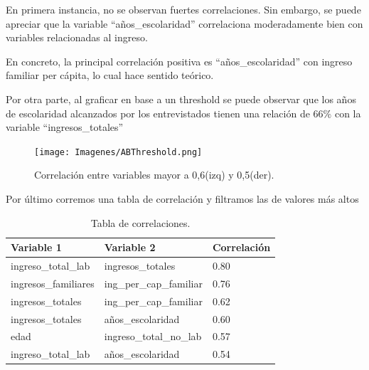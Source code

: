 \documentclass[a4paper]{article}
\begin{document}
        En primera instancia, no se observan fuertes correlaciones. Sin embargo, se puede apreciar que la variable ``años\_escolaridad'' correlaciona moderadamente bien con variables relacionadas al ingreso.
 
        En concreto, la principal correlación positiva es ``años\_escolaridad'' con ingreso familiar per cápita, lo cual hace sentido teórico.
        
        Por otra parte, al graficar en base a un threshold se puede observar que los años de escolaridad alcanzados por los entrevistados tienen una relación de $66\%$ con la variable ``ingresos\_totales''

        \begin{figure}[H]
            \centering
            \texttt{[image: Imagenes/ABThreshold.png]}
            \caption{Correlación entre variables mayor a 0,6(izq) y 0,5(der).}
            \label{AB Treshold Correlation}
        \end{figure}
 
        Por último corremos una tabla de correlación y filtramos las de valores más altos
 
        \begin{table}[H]
            \centering
            \begin{tabular}{|l|l|l|}
            \hline
                Variable 1 & Variable 2 & Correlación \\ \hline
                ingreso\_total\_lab & ingresos\_totales & 0.80 \\ \hline
                ingresos\_familiares & ing\_per\_cap\_familiar & 0.76 \\ \hline
                ingresos\_totales & ing\_per\_cap\_familiar & 0.62 \\ \hline
                ingresos\_totales & años\_escolaridad & 0.60 \\ \hline
                edad & ingreso\_total\_no\_lab & 0.57 \\ \hline
                ingreso\_total\_lab & años\_escolaridad & 0.54 \\ \hline
            \end{tabular}
            \caption{Tabla de correlaciones.}
            \label{AB Correlation Table}
        \end{table}
 
\end{document}
